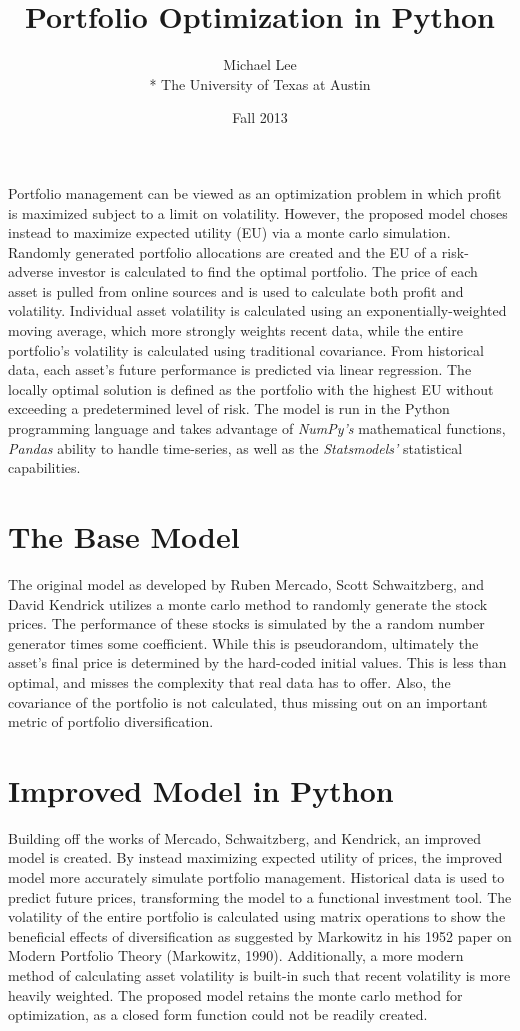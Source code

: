\documentclass[12pt]{article}
\title{Portfolio Optimization in Python}
\author{Michael Lee \\*
The University of Texas at Austin}
\date{Fall 2013}
\begin{document}
\maketitle{}
Portfolio management can be viewed as an optimization problem in which profit is maximized subject to a limit on volatility. However, the proposed model choses instead to maximize expected utility (EU) via a monte carlo simulation. Randomly generated portfolio allocations are created and the EU of a risk-adverse investor is calculated to find the optimal portfolio. The price of each asset is pulled from online sources and is used to calculate both profit and volatility. Individual asset volatility is calculated using an exponentially-weighted moving average, which more strongly weights recent data, while the entire portfolio's volatility is calculated using traditional covariance. From historical data, each asset's future performance is predicted via linear regression. The locally optimal solution is defined as the portfolio with the highest EU without exceeding a predetermined level of risk. The model is run in the Python programming language and takes advantage of \emph{NumPy's} mathematical functions, \emph{Pandas} ability to handle time-series, as well as the \emph{Statsmodels'} statistical capabilities. 

\newpage
\section{The Base Model}
The original model as developed by Ruben Mercado, Scott Schwaitzberg, and David Kendrick utilizes a monte carlo method to randomly generate the stock prices. The performance of these stocks is simulated by the a random number generator times some coefficient. While this is pseudorandom, ultimately the asset's final price is determined by the hard-coded initial values. This is less than optimal, and misses the complexity that real data has to offer. Also, the covariance of the portfolio is not calculated, thus missing out on an important metric of portfolio diversification. 


\section{Improved Model in Python}
Building off the works of Mercado, Schwaitzberg, and Kendrick, an improved model is created. By instead maximizing expected utility of prices, the improved model more accurately simulate portfolio management. Historical data is used to predict future prices, transforming the model to a functional investment tool. The volatility of the entire portfolio is calculated using matrix operations to show the beneficial effects of diversification as suggested by Markowitz in his 1952 paper on Modern Portfolio Theory (Markowitz, 1990). Additionally, a more modern method of calculating asset volatility is built-in such that recent volatility is more heavily weighted. The proposed model retains the monte carlo method for optimization, as a closed form function could not be readily created.
\end{document}
